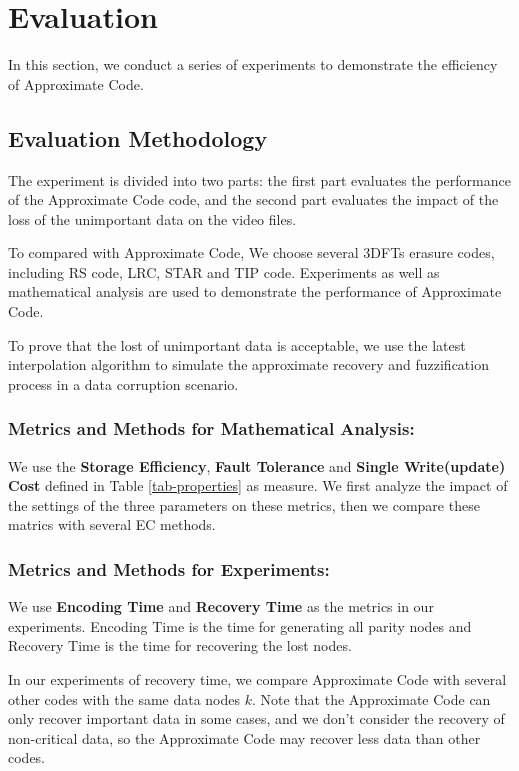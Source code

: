 \documentclass[sigconf]{acmart}
\begin{document}
\section{Evaluation}\label{evaluation}
In this section, we conduct a series of experiments to demonstrate the efficiency of Approximate Code.
\subsection{Evaluation Methodology}
The experiment is divided into two parts: the first part evaluates the performance of the Approximate Code code, and the second part evaluates the impact of the loss of the unimportant data on the video files.

To compared with Approximate Code, We choose several 3DFTs erasure codes, including RS code, LRC, STAR and TIP code.
Experiments as well as mathematical analysis are used to demonstrate the performance of Approximate Code.

To prove that the lost of unimportant data is acceptable, we use the latest interpolation algorithm to simulate the approximate recovery and fuzzification process in a data corruption scenario.

\subsubsection{Metrics and Methods for Mathematical Analysis: }
We use the \textbf{Storage Efficiency}, \textbf{Fault Tolerance} and \textbf{Single Write(update) Cost} defined in Table \ref{tab-properties} as measure.
We first analyze the impact of the settings of the three parameters on these metrics, then we compare these matrics with several EC methods.

\subsubsection{Metrics and Methods for Experiments: }
We use \textbf{Encoding Time} and \textbf{Recovery Time} as the metrics in our experiments. Encoding Time is the time for generating all parity nodes and Recovery Time is the time for recovering the lost nodes.

In our experiments of recovery time, we compare Approximate Code with several other codes with the same data nodes $k$.
Note that the Approximate Code can only recover important data in some cases, and we don't consider the recovery of non-critical data, so the Approximate Code may recover less data than other codes.
\end{document}
